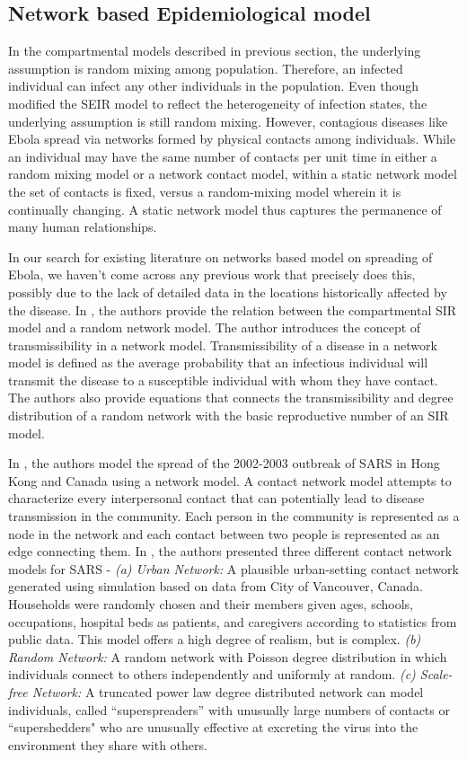 \documentclass[10pt, journal,onecolumn]{IEEEtran}
\begin{document}
\subsection{{Network based Epidemiological model}}

In the compartmental models described in previous section, the underlying assumption is random mixing among population. Therefore, an infected individual can infect any other individuals in the population. Even though \citep{legrand2007understanding} modified the SEIR model to reflect the heterogeneity of infection states, the underlying assumption is still random mixing. However, contagious diseases like Ebola spread via networks formed by physical contacts among individuals. While an individual may have the same number of contacts per unit time in either a random mixing model or a network contact model, within a static network model the set of
contacts is fixed, versus a random-mixing model wherein it is continually changing. A static network model thus captures the permanence of many human relationships. 

In our search for existing literature on networks based model on spreading of Ebola, we haven't come across any previous work that precisely does this, possibly due to the lack of detailed data in the locations historically affected by the disease.  In \citep{newman2002spread}, the authors provide the relation between the compartmental SIR model and a random network model. The author introduces the concept of transmissibility in a network model. Transmissibility of a disease in a network model is defined as the average probability that an infectious individual will transmit the disease to a susceptible individual with whom they have contact. The authors also provide equations that connects the transmissibility and degree distribution of a random network with the basic reproductive number of an SIR model.  

In \citep{meyers2005network}, the authors model the spread of the 2002-2003 outbreak of SARS in Hong Kong and Canada using a network model. A contact network model attempts to characterize every interpersonal contact that can potentially lead to disease transmission in the
community. Each person in the community is represented as a node in the network and each contact between
two people is represented as an edge connecting them.
In \citep{meyers2005network}, the authors presented three different contact network models for SARS -  \textit{(a) Urban Network:} A plausible urban-setting contact network generated using simulation based on data from City of Vancouver, Canada. Households were randomly chosen and  their members given ages, schools, occupations, hospital beds as patients, and  caregivers according to statistics from public data.  This model offers a high degree of realism, but is complex. \textit{(b) Random Network:} A random network with Poisson degree distribution in which individuals connect to others independently and uniformly at random. \textit{(c) Scale-free Network:}  A truncated power law degree distributed network can model individuals, called ``superspreaders'' with unusually large numbers of contacts or ``supershedders" who are unusually effective at
  excreting the virus into the environment they share with others. 
  
\end{document}
